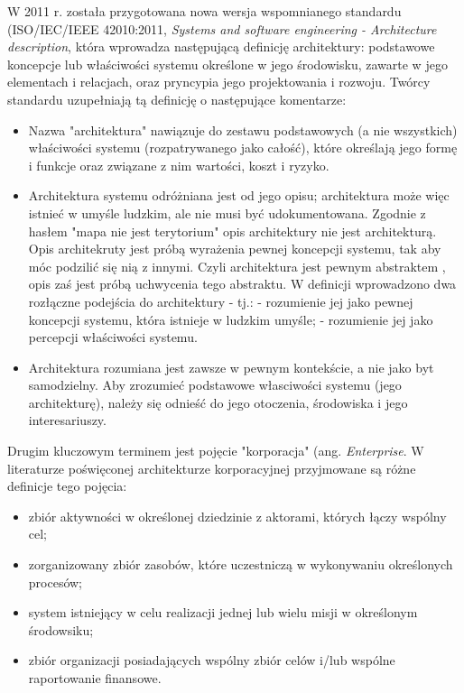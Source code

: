 W 2011 r. została przygotowana nowa wersja wspomnianego standardu (ISO/IEC/IEEE 42010:2011, \textit{Systems and software engineering - Architecture description}, która wprowadza następującą definicję architektury: podstawowe koncepcje lub właściwości systemu określone w jego środowisku, zawarte w jego elementach i relacjach, oraz pryncypia jego projektowania i rozwoju. Twórcy standardu uzupełniają tą definicję o następujące komentarze: 
\begin{itemize}
\item{Nazwa "architektura" nawiązuje do zestawu podstawowych (a nie wszystkich) właściwości systemu (rozpatrywanego jako całość), które określają jego formę i funkcje oraz związane z nim wartości, koszt i ryzyko.}
\item{Architektura systemu odróżniana jest od jego opisu; architektura może więc istnieć w umyśle ludzkim, ale nie musi być udokumentowana. Zgodnie z hasłem "mapa nie jest terytorium" opis architektury nie jest architekturą. Opis architekruty jest próbą wyrażenia pewnej koncepcji systemu, tak aby móc podzilić się nią z innymi. Czyli architektura jest pewnym abstraktem , opis zaś jest próbą uchwycenia tego abstraktu.
W definicji wprowadzono dwa rozłączne podejścia do architektury - tj.:
- rozumienie jej jako pewnej koncepcji systemu, która istnieje w ludzkim umyśle;
- rozumienie jej jako percepcji właściwości systemu.}
\item{Architektura rozumiana jest zawsze w pewnym kontekście, a nie jako byt samodzielny. Aby zrozumieć podstawowe własciwości systemu (jego architekturę), należy się odnieść do jego otoczenia, środowiska i jego interesariuszy.}
\end{itemize}

Drugim kluczowym terminem jest pojęcie "korporacja" (ang. \textit{Enterprise}. W literaturze poświęconej architekturze korporacyjnej przyjmowane są różne definicje tego pojęcia:

\begin{itemize}
\item{zbiór aktywności w określonej dziedzinie z aktorami, których łączy wspólny cel;}
\item{zorganizowany zbiór zasobów, które uczestniczą w wykonywaniu określonych procesów;}
\item{system istniejący w celu realizacji jednej lub wielu misji w określonym środowsiku;}
\item{zbiór organizacji posiadających wspólny zbiór celów i/lub wspólne raportowanie finansowe.}
\end{itemize}

